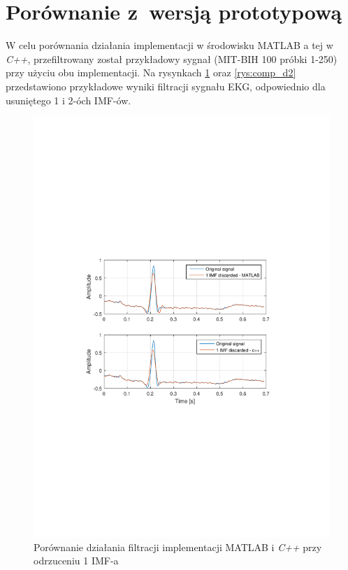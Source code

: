 \section{Porównanie z~wersją prototypową}

W celu porównania działania implementacji w środowisku \textrm{MATLAB} a tej w
\textit{C++}, przefiltrowany został przykładowy sygnał (MIT-BIH 100 próbki
1-250) przy użyciu obu implementacji. Na rysynkach \ref{rys:comp_d1} oraz
\ref{rys:comp_d2} przedstawiono przykładowe wyniki filtracji sygnału EKG,
odpowiednio dla usuniętego 1 i 2-óch IMF-ów.

\begin{figure}[!htb]
    \begin{center}
        \includegraphics[width=14cm,trim=4cm 9cm 4cm 9cm,clip]
        {../img/mat_cpp_domp_d1.pdf}
    \end{center}
    \caption{Porównanie działania filtracji implementacji \textrm{MATLAB} i
    \textit{C++} przy odrzuceniu 1 IMF-a}
    \label{rys:comp_d1}
\end{figure}

